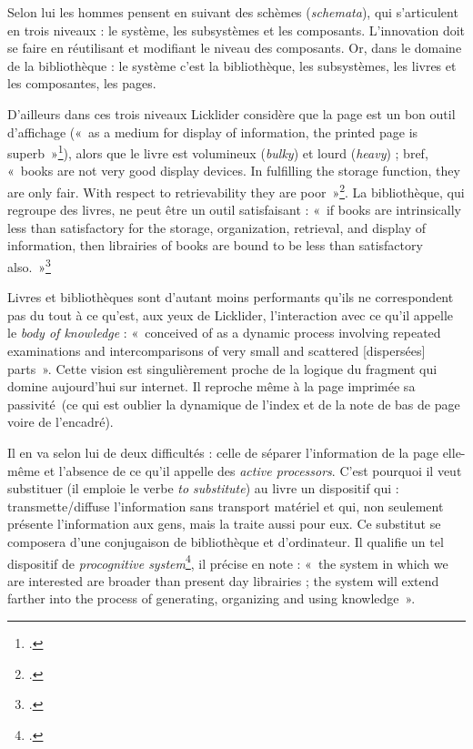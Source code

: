 \documentclass{FramateX}
\begin{document}
\begin{refsection}
Selon lui les hommes pensent en suivant des schèmes (\textit{schemata}), qui
s'articulent en trois niveaux : le système, les subsystèmes et les
composants. L'innovation doit se faire en réutilisant et modifiant le
niveau des composants. Or, dans le domaine de la bibliothèque : le
système c'est la bibliothèque, les subsystèmes, les livres et les
composantes, les pages. 


D'ailleurs dans ces trois niveaux Licklider considère que la page
est un bon outil d'affichage («~as a medium for display of information,
the printed page is superb~»\footnote{\cite[p.~4]{lickliderlibraries1965}.}), alors que le livre est volumineux
(\textit{bulky}) et lourd (\textit{heavy}) ; bref, «~books are not very good display
devices. In fulfilling the storage function, they are only fair. With
respect to retrievability they are poor~»\footnote{\cite[p.~5]{lickliderlibraries1965}.}. La bibliothèque, qui
regroupe des livres, ne peut être un outil satisfaisant : «~if books are
intrinsically less than satisfactory for the storage, organization,
retrieval, and display of information, then librairies of books are
bound to be less than satisfactory also.~»\footnote{\cite[p.~5]{lickliderlibraries1965}.}


Livres et bibliothèques sont d'autant moins performants qu'ils ne
correspondent pas du tout à ce qu'est, aux yeux de  Licklider,
l'interaction avec ce qu'il appelle le \textit{body of knowledge} :
«~conceived of as a dynamic process involving repeated examinations and
intercomparisons of very small and scattered [dispersées] parts~». Cette
vision est singulièrement proche de la logique du fragment qui domine
aujourd'hui sur internet. Il reproche même à la page imprimée sa
passivité~(ce qui est oublier la dynamique de l'index et de la note de
bas de page voire de l'encadré).


Il en va selon lui de deux difficultés : celle de séparer l'information
de la page elle-même et l'absence de ce qu'il appelle des \textit{active
processors}. C'est pourquoi il veut substituer (il emploie le verbe \textit{to
substitute}) au livre un dispositif qui : transmette/diffuse
l'information sans transport matériel et qui, non seulement présente
l'information aux gens, mais la traite aussi pour eux. Ce substitut se
composera d'une conjugaison de bibliothèque et d'ordinateur. Il
qualifie un tel dispositif de \textit{procognitive system}\footnote{\cite[p.~5]{lickliderlibraries1965}.}, il précise
en note : «~the system in which we are interested are broader than
present day librairies ; the system will extend farther into the
process of generating, organizing and using knowledge~».



\end{refsection}
\end{document}
